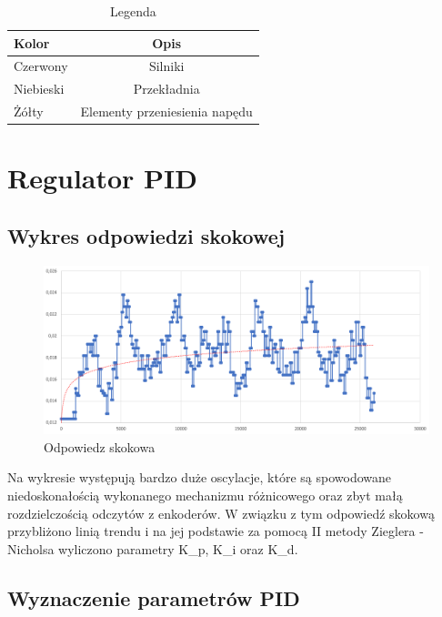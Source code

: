 \documentclass[10pt, a4paper]{article}
\begin{document}
	
		\begin{table}[H]
			\centering
			\begin{tabular}{|l|c|} \hline
				\textbf{Kolor} & \textbf{Opis} \\
				\hline  Czerwony & Silniki  \\\hline
				Niebieski & Przekładnia\\\hline
				Żółty &  Elementy przeniesienia napędu\\
				\hline
			\end{tabular}
			\caption{Legenda}
			\label{tab:Legenda}
		\end{table}

\section{Regulator PID}

\subsection{Wykres odpowiedzi skokowej}
\begin{figure}[H]
		\centering
		\includegraphics[width=1\textwidth]{figures/odp.png}
		\caption{Odpowiedz skokowa}
		\label{fig:Odpowiedz skokowa}
	\end{figure}
	
	Na wykresie występują bardzo duże oscylacje, które są spowodowane niedoskonałością wykonanego mechanizmu różnicowego oraz zbyt małą rozdzielczością odczytów z enkoderów. W związku z tym odpowiedź skokową przybliżono linią trendu i na jej podstawie za pomocą II metody Zieglera - Nicholsa wyliczono parametry K_{p}, K_{i} \hspace{0.1cm} oraz \hspace{0.1cm} K_{d}.
	
\subsection{Wyznaczenie parametrów PID}
\end{document}

